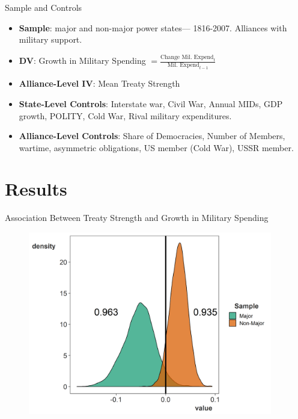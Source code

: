 \documentclass{beamer}
\begin{document}
\begin{frame}{Sample and Controls}

\begin{itemize}
\item \textbf{Sample}: major and non-major power states--- 1816-2007. Alliances with military support. 
\pause
\item \textbf{DV}: Growth in Military Spending $ = \frac{ \mbox{Change Mil. Expend}_t }{ \mbox{Mil. Expend}_{t-1} }$ 
\pause
\item \textbf{Alliance-Level IV}: Mean Treaty Strength
\pause
\item \textbf{State-Level Controls}: Interstate war, Civil War, Annual MIDs, GDP growth, POLITY, Cold War, Rival military expenditures. 
\pause 
\item \textbf{Alliance-Level Controls}: Share of Democracies, Number of Members, wartime, asymmetric obligations, US member (Cold War), USSR member.

\end{itemize} 



\end{frame}


\section{Results}


\begin{frame}{Association Between Treaty Strength and Growth in Military Spending} 

\begin{figure}
	\centering
		\includegraphics[width=0.95\textwidth]{str-post.png}
	\label{fig:str-post}
\end{figure}


\end{frame}
\end{document}
